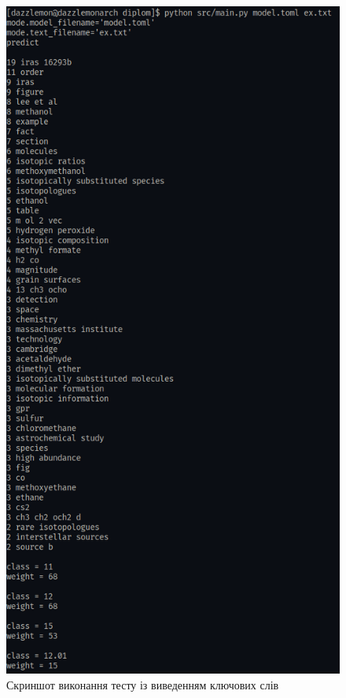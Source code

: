 \documentclass[14pt]{extarticle}
\begin{document}
  \begin{figure}[H]
    \centering
    \includegraphics[height=\textheight]{keywords_test.png}    
    \captionsetup{justification=centering}  
    \caption{Скриншот виконання тесту із виведенням ключових слів}
    \label{fig:keywords_test}
  \end{figure}
\end{document}
